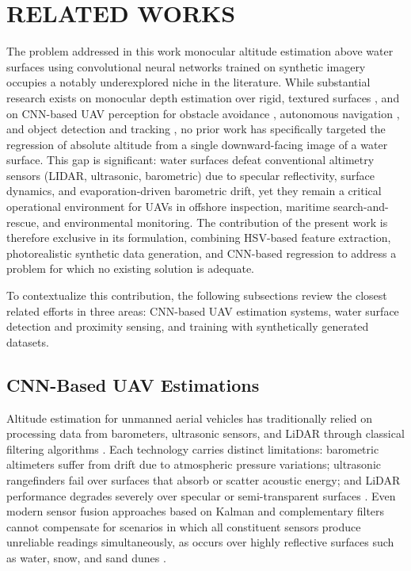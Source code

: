 \section{RELATED WORKS}

    The problem addressed in this work monocular altitude estimation above water surfaces using convolutional neural networks trained on synthetic imagery occupies a notably underexplored niche in the literature.
    While substantial research exists on monocular depth estimation over rigid, textured surfaces \cite{MonocularDepth} \cite{Joglekar2011DepthEU}, and on CNN-based UAV perception for obstacle avoidance \cite{CNNSingleImageQuadrotor} \cite{AircraftColAvoid}, autonomous navigation \cite{ByMySelf}, and object detection and tracking \cite{SurveyObjDetectionTracking} \cite{OpticalFlowStereo}, no prior work has specifically targeted the regression of absolute altitude from a single downward-facing image of a water surface.
    This gap is significant: water surfaces defeat conventional altimetry sensors (LIDAR, ultrasonic, barometric) due to specular reflectivity, surface dynamics, and evaporation-driven barometric drift, yet they remain a critical operational environment for UAVs in offshore inspection, maritime search-and-rescue, and environmental monitoring.
    The contribution of the present work is therefore exclusive in its formulation, combining HSV-based feature extraction, photorealistic synthetic data generation, and CNN-based regression to address a problem for which no existing solution is adequate.

    To contextualize this contribution, the following subsections review the closest related efforts in three areas: CNN-based UAV estimation systems, water surface detection and proximity sensing, and training with synthetically generated datasets.

    \subsection{CNN-Based UAV Estimations}

    Altitude estimation for unmanned aerial vehicles has traditionally relied on processing data from barometers, ultrasonic sensors, and LiDAR through classical filtering algorithms \cite{MonocularDepth}.
    Each technology carries distinct limitations: barometric altimeters suffer from drift due to atmospheric pressure variations; ultrasonic rangefinders fail over surfaces that absorb or scatter acoustic energy; and LiDAR performance degrades severely over specular or semi-transparent surfaces \cite{FiltroKalmanAltitude}.
    Even modern sensor fusion approaches based on Kalman and complementary filters cannot compensate for scenarios in which all constituent sensors produce unreliable readings simultaneously, as occurs over highly reflective surfaces such as water, snow, and sand dunes \cite{WeatherConstraints}.

